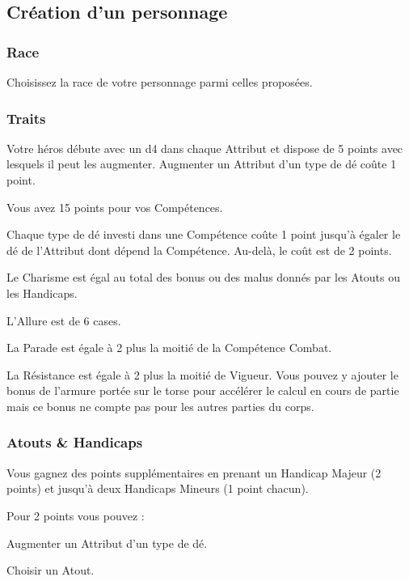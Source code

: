 \clearpage
\subsection{Création d'un personnage}

\subsubsection{Race}
Choisissez la race de votre personnage parmi celles proposées.

\subsubsection{Traits}
\begin{rebelist}
	\item Votre héros débute avec un d4 dans chaque Attribut et dispose de 5 points avec lesquels il peut les augmenter. Augmenter un Attribut d’un type de 	dé coûte 1 point.
	\item Vous avez 15 points pour vos Compétences.
	\item Chaque type de dé investi dans une Compétence coûte 1 point jusqu’à égaler le dé de l’Attribut dont dépend la Compétence. Au-delà, le coût est de 	2 points.
	\item Le Charisme est égal au total des bonus ou des malus donnés par les Atouts ou les Handicaps.
	\item L’Allure est de 6 cases.
	\item La Parade est égale à 2 plus la moitié de la Compétence Combat.
	\item La Résistance est égale à 2 plus la moitié de Vigueur. Vous pouvez y ajouter le bonus de l’armure portée sur le torse pour accélérer le calcul en 	cours de partie mais ce bonus ne compte pas pour les autres parties du corps.
\end{rebelist}

\subsubsection{Atouts \& Handicaps}
Vous gagnez des points supplémentaires en prenant un Handicap Majeur (2 points) et jusqu’à deux Handicaps Mineurs (1 point chacun).

Pour 2 points vous pouvez :
\begin{rebelist}
	\item Augmenter un Attribut d’un type de dé.
	\item Choisir un Atout.
\end{rebelist}

